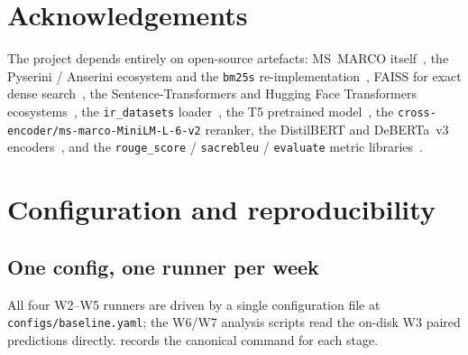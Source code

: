 \documentclass[11pt,a4paper]{article}
\newcommand{\msmarco}{MS~MARCO}
\begin{document}
\clearpage
\section*{Acknowledgements}

The project depends entirely on open-source artefacts: \msmarco{}
itself~\cite{bajaj2016msmarco,nguyen2016msmarcoqa},
the Pyserini / Anserini ecosystem and the \texttt{bm25s}
re-implementation~\cite{lin2021pyserini,lu2024bm25s}, FAISS for
exact dense search~\cite{johnson2019faiss}, the Sentence-Transformers
and Hugging Face Transformers
ecosystems~\cite{reimers2019sbert,wolf2020transformers}, the
\texttt{ir\_datasets} loader~\cite{macavaney2021irdatasets}, the
T5 pretrained model~\cite{raffel2020t5}, the
\texttt{cross-encoder/ms-marco-MiniLM-L-6-v2} reranker, the
DistilBERT and DeBERTa~v3
encoders~\cite{sanh2019distilbert,he2023debertav3}, and the
\texttt{rouge\_score} / \texttt{sacrebleu} / \texttt{evaluate}
metric libraries~\cite{lin2004rouge,papineni2002bleu}.

\clearpage
\printbibliography[heading=bibintoc,title={References}]

\clearpage
\appendix

\section{Configuration and reproducibility}
\label{sec:reproducibility}

\subsection{One config, one runner per week}

All four W2--W5 runners are driven by a single configuration file
at \texttt{configs/baseline.yaml}; the W6/W7 analysis scripts read
the on-disk W3 paired predictions directly.  
records the canonical command for each stage.
\end{document}
